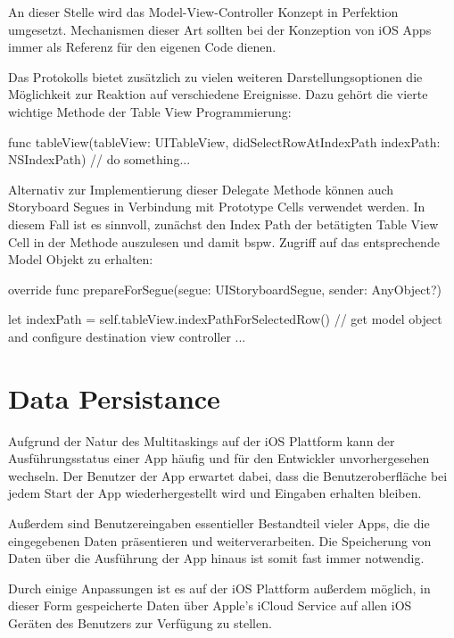 \documentclass[parskip=half, final]{scrreprt}
\begin{document}
An dieser Stelle wird das Model-View-Controller Konzept  in Perfektion umgesetzt. Mechanismen dieser Art sollten bei der Konzeption von iOS Apps immer als Referenz für den eigenen Code dienen.

Das  Protokolls bietet zusätzlich zu vielen weiteren Darstellungsoptionen die Möglichkeit zur Reaktion auf verschiedene Ereignisse. Dazu gehört die vierte wichtige Methode der Table View Programmierung:

\begin{swiftcode}
func tableView(tableView: UITableView, didSelectRowAtIndexPath indexPath: NSIndexPath) {
    // do something...
}
\end{swiftcode}

Alternativ zur Implementierung dieser Delegate Methode können auch Storyboard Segues in Verbindung mit Prototype Cells verwendet werden. In diesem Fall ist es sinnvoll, zunächst den Index Path der betätigten Table View Cell in der  Methode auszulesen und damit bspw. Zugriff auf das entsprechende Model Objekt zu erhalten:

\begin{swiftcode}
override func prepareForSegue(segue: UIStoryboardSegue, sender: AnyObject?) {
    let indexPath = self.tableView.indexPathForSelectedRow()
    // get model object and configure destination view controller ...

}
\end{swiftcode}


\section{Data Persistance}

Aufgrund der Natur des Multitaskings auf der iOS Plattform kann der Ausführungsstatus einer App  häufig und für den Entwickler unvorhergesehen wechseln. Der Benutzer der App erwartet dabei, dass die Benutzeroberfläche bei jedem Start der App wiederhergestellt wird und Eingaben erhalten bleiben.

Außerdem sind Benutzereingaben essentieller Bestandteil vieler Apps, die die eingegebenen Daten präsentieren und weiterverarbeiten. Die Speicherung von Daten über die Ausführung der App hinaus ist somit fast immer notwendig.

Durch einige Anpassungen ist es auf der iOS Plattform außerdem möglich, in dieser Form gespeicherte Daten über Apple's iCloud Service auf allen iOS Geräten des Benutzers zur Verfügung zu stellen.
\end{document}
